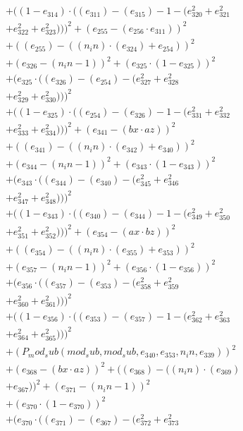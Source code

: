 \documentclass[10pt, a4paper]{article}
\begin{document}
\begin{align*}
& + ((1 - e_{314})  \cdot  ((e_{311}) - (e_{315}) - 1 - (e_{320}^{2} + e_{321}^{2} \\
& + e_{322}^{2} + e_{323}^{2})))^{2} + (e_{255} - (e_{256}  \cdot  e_{311}))^{2} \\
& + ((e_{255}) - ((n_in)  \cdot  (e_{324}) + e_{254}))^{2} \\
& + (e_{326} - (n_in - 1))^{2} + (e_{325}  \cdot  (1 - e_{325}))^{2} \\
& + (e_{325}  \cdot  ((e_{326}) - (e_{254}) - (e_{327}^{2} + e_{328}^{2} \\
& + e_{329}^{2} + e_{330}^{2})))^{2} \\
& + ((1 - e_{325})  \cdot  ((e_{254}) - (e_{326}) - 1 - (e_{331}^{2} + e_{332}^{2} \\
& + e_{333}^{2} + e_{334}^{2})))^{2} + (e_{341} - (bx  \cdot  az))^{2} \\
& + ((e_{341}) - ((n_in)  \cdot  (e_{342}) + e_{340}))^{2} \\
& + (e_{344} - (n_in - 1))^{2} + (e_{343}  \cdot  (1 - e_{343}))^{2} \\
& + (e_{343}  \cdot  ((e_{344}) - (e_{340}) - (e_{345}^{2} + e_{346}^{2} \\
& + e_{347}^{2} + e_{348}^{2})))^{2} \\
& + ((1 - e_{343})  \cdot  ((e_{340}) - (e_{344}) - 1 - (e_{349}^{2} + e_{350}^{2} \\
& + e_{351}^{2} + e_{352}^{2})))^{2} + (e_{354} - (ax  \cdot  bz))^{2} \\
& + ((e_{354}) - ((n_in)  \cdot  (e_{355}) + e_{353}))^{2} \\
& + (e_{357} - (n_in - 1))^{2} + (e_{356}  \cdot  (1 - e_{356}))^{2} \\
& + (e_{356}  \cdot  ((e_{357}) - (e_{353}) - (e_{358}^{2} + e_{359}^{2} \\
& + e_{360}^{2} + e_{361}^{2})))^{2} \\
& + ((1 - e_{356})  \cdot  ((e_{353}) - (e_{357}) - 1 - (e_{362}^{2} + e_{363}^{2} \\
& + e_{364}^{2} + e_{365}^{2})))^{2} \\
& + (P_mod_sub(mod_sub, mod_sub, e_{340}, e_{353}, n_in, e_{339}))^{2} \\
& + (e_{368} - (bx  \cdot  az))^{2} + ((e_{368}) - ((n_in)  \cdot  (e_{369}) \\
& + e_{367}))^{2} + (e_{371} - (n_in - 1))^{2} \\
& + (e_{370}  \cdot  (1 - e_{370}))^{2} \\
& + (e_{370}  \cdot  ((e_{371}) - (e_{367}) - (e_{372}^{2} + e_{373}^{2} \\

\end{align*}
\end{document}
